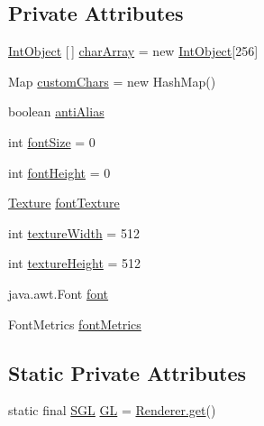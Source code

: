 \subsection*{Private Attributes}
\begin{DoxyCompactItemize}
\item 
\mbox{\hyperlink{classorg_1_1newdawn_1_1slick_1_1_true_type_font_classorg_1_1newdawn_1_1slick_1_1_true_type_font_1_1_int_object}{Int\+Object}} \mbox{[}$\,$\mbox{]} \mbox{\hyperlink{classorg_1_1newdawn_1_1slick_1_1_true_type_font_ae10a9ca17036288b7f76bd7ca10e4ea6}{char\+Array}} = new \mbox{\hyperlink{classorg_1_1newdawn_1_1slick_1_1_true_type_font_classorg_1_1newdawn_1_1slick_1_1_true_type_font_1_1_int_object}{Int\+Object}}\mbox{[}256\mbox{]}
\item 
Map \mbox{\hyperlink{classorg_1_1newdawn_1_1slick_1_1_true_type_font_a9043b8f092d2d1b8c7d65a4518fc4d3f}{custom\+Chars}} = new Hash\+Map()
\item 
boolean \mbox{\hyperlink{classorg_1_1newdawn_1_1slick_1_1_true_type_font_a1dc8e98ba06633544ec9f69c434dc126}{anti\+Alias}}
\item 
int \mbox{\hyperlink{classorg_1_1newdawn_1_1slick_1_1_true_type_font_ac16e29cb90eac37712d06dc36aaced56}{font\+Size}} = 0
\item 
int \mbox{\hyperlink{classorg_1_1newdawn_1_1slick_1_1_true_type_font_a9bf36f9ee8aac6e87f0d1e2ba299cb3e}{font\+Height}} = 0
\item 
\mbox{\hyperlink{interfaceorg_1_1newdawn_1_1slick_1_1opengl_1_1_texture}{Texture}} \mbox{\hyperlink{classorg_1_1newdawn_1_1slick_1_1_true_type_font_ace4f234c78e28498a78c1879c943704a}{font\+Texture}}
\item 
int \mbox{\hyperlink{classorg_1_1newdawn_1_1slick_1_1_true_type_font_a9b5d5e4b07516d5c5f2918de908a6305}{texture\+Width}} = 512
\item 
int \mbox{\hyperlink{classorg_1_1newdawn_1_1slick_1_1_true_type_font_aca6f680b23843c55b4ac0fd6097204b5}{texture\+Height}} = 512
\item 
java.\+awt.\+Font \mbox{\hyperlink{classorg_1_1newdawn_1_1slick_1_1_true_type_font_a7c0b002b6010aa855bf4391ecf749498}{font}}
\item 
Font\+Metrics \mbox{\hyperlink{classorg_1_1newdawn_1_1slick_1_1_true_type_font_ad34436ad15502ef14d8e1a4092d7ab2f}{font\+Metrics}}
\end{DoxyCompactItemize}
\subsection*{Static Private Attributes}
\begin{DoxyCompactItemize}
\item 
static final \mbox{\hyperlink{interfaceorg_1_1newdawn_1_1slick_1_1opengl_1_1renderer_1_1_s_g_l}{S\+GL}} \mbox{\hyperlink{classorg_1_1newdawn_1_1slick_1_1_true_type_font_a2a59b22a758ee1ea01b39a890bb9ce35}{GL}} = \mbox{\hyperlink{classorg_1_1newdawn_1_1slick_1_1opengl_1_1renderer_1_1_renderer_abe742c3a7dfca67c6c01821d27087308}{Renderer.\+get}}()
\end{DoxyCompactItemize}



